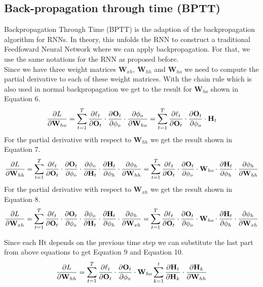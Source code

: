 \documentclass{article}
\begin{document}
\subsection{Back-propagation through time (BPTT)}
Backpropagation Through Time (BPTT) is the adaption of the backpropagation algorithm for RNNs. In theory, this unfolds the RNN to construct a traditional Feedfoward Neural Network where
we can apply backpropagation. For that, we use the same notations for the RNN as proposed before. \\


Since we have three weight matrices $\mathbf{W}_{xh}$, $\mathbf{W}_{hh}$ and $\mathbf{W}_{ho}$ we need to compute the partial derivative to each of these weight matrices. With the chain rule which is also used in normal backpropagation we get to the result for $\mathbf{W}_{ho}$ shown in Equation 6.
\begin{equation}
  \pdv{L}{\mathbf{W}_{ho}} = \sum_{t=1}^T \pdv{\ell_t}{\mathbf{O}_t} \cdot \pdv{\mathbf{O}_t}{\phi_o} \cdot \pdv{\phi_o}{\mathbf{W}_{ho}} = \sum_{t=1}^T \pdv{\ell_t}{\mathbf{O}_t} \cdot \pdv{\mathbf{O}_t}{\phi_o} \cdot \mathbf{H}_t
\end{equation}
For the partial derivative with respect to $\mathbf{W}_{hh}$ we get the result shown in Equation 7.
\begin{equation}
  \pdv{L}{\mathbf{W}_{hh}} = \sum_{t=1}^T \pdv{\ell_t}{\mathbf{O}_t} \cdot \pdv{\mathbf{O}_t}{\phi_o} \cdot \pdv{\phi_o}{\mathbf{H}_t} \cdot \pdv{\mathbf{H}_t}{\phi_h} \cdot \pdv{\phi_h}{\mathbf{W}_{hh}}
= \sum_{t=1}^T \pdv{\ell_t}{\mathbf{O}_t} \cdot \pdv{\mathbf{O}_t}{\phi_o} \cdot \mathbf{W}_{ho} \cdot \pdv{\mathbf{H}_t}{\phi_h} \cdot \pdv{\phi_h}{\mathbf{W}_{hh}}
\end{equation}
For the partial derivative with respect to $\mathbf{W}_{xh}$ we get the result shown in Equation 8.
\begin{equation}
  \pdv{L}{\mathbf{W}_{xh}} = \sum_{t=1}^T \pdv{\ell_t}{\mathbf{O}_t} \cdot \pdv{\mathbf{O}_t}{\phi_o} \cdot \pdv{\phi_o}{\mathbf{H}_t} \cdot \pdv{\mathbf{H}_t}{\phi_h} \cdot \pdv{\phi_h}{\mathbf{W}_{xh}}
  = \sum_{t=1}^T \pdv{\ell_t}{\mathbf{O}_t} \cdot \pdv{\mathbf{O}_t}{\phi_o} \cdot \mathbf{W}_{ho} \cdot \pdv{\mathbf{H}_t}{\phi_h} \cdot \pdv{\phi_h}{\mathbf{W}_{xh}}
\end{equation}

Since each Ht depends on the previous time step we can substitute the last part from above equations
to get Equation 9 and Equation 10.
\begin{equation}
  \pdv{L}{\mathbf{W}_{hh}} = \sum_{t=1}^T \pdv{\ell_t}{\mathbf{O}_t} \cdot \pdv{\mathbf{O}_t}{\phi_o} \cdot \mathbf{W}_{ho} \sum_{k=1}^t \pdv{\mathbf{H}_t}{\mathbf{H}_k} \cdot \pdv{\mathbf{H}_k}{\mathbf{W}_{hh}}
\end{equation}
\end{document}
